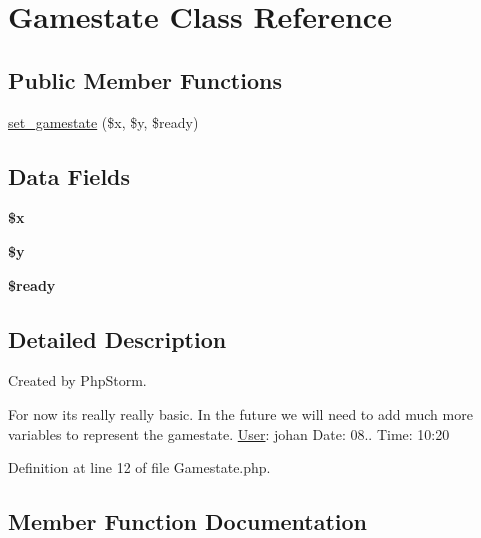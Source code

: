 \hypertarget{class_gamestate}{}\section{Gamestate Class Reference}
\label{class_gamestate}
\subsection*{Public Member Functions}
\begin{DoxyCompactItemize}
\item 
\hyperlink{class_gamestate_af2c914e71eb7de493aa29ec74b056997}{set\+\_\+gamestate} (\$x, \$y, \$ready)
\end{DoxyCompactItemize}
\subsection*{Data Fields}
\begin{DoxyCompactItemize}
\item 
\mbox{\label{class_gamestate_af3a16c5f0dd7a74cf9acf6a49fff73a7}} 
{\bfseries \$x}
\item 
\mbox{\label{class_gamestate_a77b973d137fb33212e018b042df6e3e7}} 
{\bfseries \$y}
\item 
\mbox{\label{class_gamestate_a76607f6a98433069a027747681395fb0}} 
{\bfseries \$ready}
\end{DoxyCompactItemize}


\subsection{Detailed Description}
Created by Php\+Storm.

For now its really really basic. In the future we will need to add much more variables to represent the gamestate. \hyperlink{class_user}{User}\+: johan Date\+: 08.. Time\+: 10\+:20 

Definition at line 12 of file Gamestate.\+php.



\subsection{Member Function Documentation}
\mbox{\label{class_gamestate_af2c914e71eb7de493aa29ec74b056997}} 

